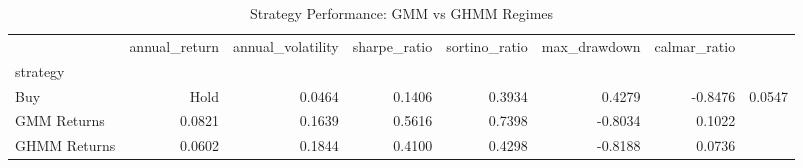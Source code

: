 \begin{table}
\caption{Strategy Performance: GMM vs GHMM Regimes}
\label{tab:comparison_performance}
\begin{tabular}{lrrrrrr}
\toprule
 & annual_return & annual_volatility & sharpe_ratio & sortino_ratio & max_drawdown & calmar_ratio \\
strategy &  &  &  &  &  &  \\
\midrule
Buy & Hold & 0.0464 & 0.1406 & 0.3934 & 0.4279 & -0.8476 & 0.0547 \\
GMM Returns & 0.0821 & 0.1639 & 0.5616 & 0.7398 & -0.8034 & 0.1022 \\
GHMM Returns & 0.0602 & 0.1844 & 0.4100 & 0.4298 & -0.8188 & 0.0736 \\
\bottomrule
\end{tabular}
\end{table}
